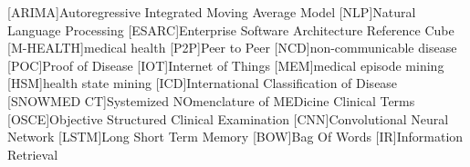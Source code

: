 \begin{acronym}[SNOWMED CT]
[ARIMA]{Autoregressive Integrated Moving Average Model}
[NLP]{Natural Language Processing}
[ESARC]{Enterprise Software Architecture Reference Cube}
[M-HEALTH]{medical health}
[P2P]{Peer to Peer}
[NCD]{non-communicable disease}
[POC]{Proof of Disease}
[IOT]{Internet of Things}
[MEM]{medical episode mining}
[HSM]{health state mining}
[ICD]{International Classification of Disease}
[SNOWMED CT]{Systemized NOmenclature of MEDicine Clinical Terms}
[OSCE]{Objective Structured Clinical Examination}
[CNN]{Convolutional Neural Network}
[LSTM]{Long Short Term Memory}
[BOW]{Bag Of Words}
[IR]{Information Retrieval}
\end{acronym}